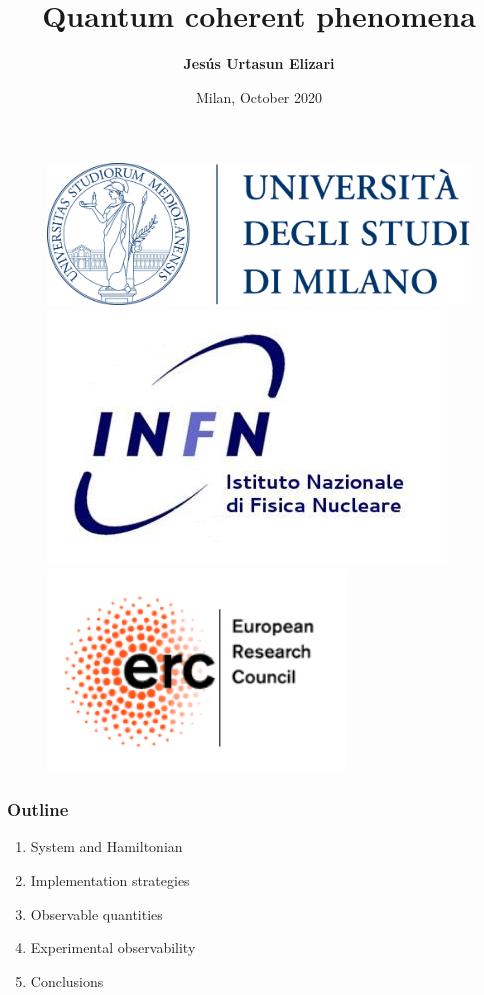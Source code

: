 \documentclass[aspectratio=43]{beamer}
\title[Quantum coherent phenomena]{Quantum coherent phenomena}
\author{\textbf {Jes\'us Urtasun Elizari}}
\date{Milan, October 2020}
\begin{document}
\begin{frame}

	\vspace{1.0 cm}
	
	
	\vspace{0.25 cm}

	\begin{figure}
		\includegraphics[width = 3.0 cm]{plots/logo_unimi.png}
		\hfill
		\includegraphics[width = 3.0 cm]{plots/logo_infn.png}
		\hfill
		\includegraphics[width = 3.0 cm]{plots/logo_erc.png}
		\endminipage
	\end{figure}

	\vspace{1.0 cm}

\end{frame}

\begin{frame}

	\frametitle{Outline}
	
	\begin{enumerate}
		\item {\color{blue}System and Hamiltonian}
		\item {\color{blue}Implementation strategies}
		\item {\color{blue}Observable quantities}
		\item {\color{blue}Experimental observability}
		\item {\color{blue}Conclusions}
	\end{enumerate}
	
\end{frame}
\end{document}
